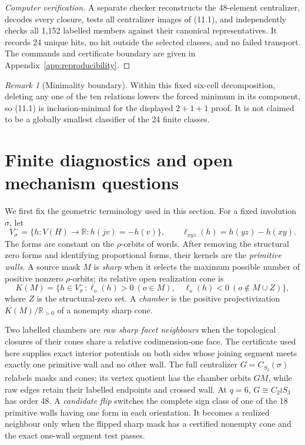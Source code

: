 \documentclass[11pt,a4paper]{article}
\theoremstyle{remark}
\newtheorem{remark}[theorem]{Remark}
\begin{document}
\begin{proof}[Computer verification]
A separate checker reconstructs the 48-element centralizer, decodes every
closure, tests all centralizer images of (11.1), and independently checks all
1,152 labelled members against their canonical representatives.  It records
24 unique hits, no hit outside the selected classes, and no failed transport.
The commands and certificate boundary are given in
Appendix~\ref{app:reproducibility}.
\end{proof}

\begin{remark}[Minimality boundary]
Within this fixed six-cell decomposition, deleting any one of the ten
relations lowers the forced minimum in its component, so (11.1) is
inclusion-minimal for the displayed \(2+1+1\) proof.  It is not claimed to be
a globally smallest classifier of the 24 finite classes.
\end{remark}

\section{Finite diagnostics and open mechanism questions}
\label{sec:diagnostics}

We first fix the geometric terminology used in this section.  For a fixed
involution \(\sigma\), let
\[
 V^-_\sigma=\{h:V(H)\to\mathbb R:h(jv)=-h(v)\},\qquad
 \ell_{xyz}(h)=h(yz)-h(xy).
\]
The forms are constant on the \(\rho\)-orbits of words.  After removing the
structural zero forms and identifying proportional forms, their kernels are
the \emph{primitive walls}.  A source mask \(M\) is \emph{sharp} when it
selects the maximum possible number of positive nonzero \(\rho\)-orbits; its
relative open realization cone is
\[
 K(M)=\{h\in V^-_\sigma:\ell_o(h)>0\ (o\in M),\quad
                  \ell_o(h)<0\ (o\notin M\cup Z)\},
\]
where \(Z\) is the structural-zero set.  A \emph{chamber} is the positive
projectivization \(K(M)/\mathbb R_{>0}\) of a nonempty sharp cone.

Two labelled chambers are \emph{raw sharp facet neighbours} when the
topological closures of their cones share a relative codimension-one face.
The certificate used here supplies exact interior potentials on both sides
whose joining segment meets exactly one primitive wall and no other wall.
The full centralizer \(G=C_{S_q}(\sigma)\) relabels masks and cones; its
vertex quotient has the chamber orbits \(GM\), while raw edges retain their
labelled endpoints and crossed wall.  At \(q=6\), \(G\cong C_2\wr S_3\) has
order 48.  A \emph{candidate flip} switches the complete sign class of one
of the 18 primitive walls having one form in each orientation.  It becomes a
realized neighbour only when the flipped sharp mask has a certified nonempty
cone and the exact one-wall segment test passes.
\end{document}
